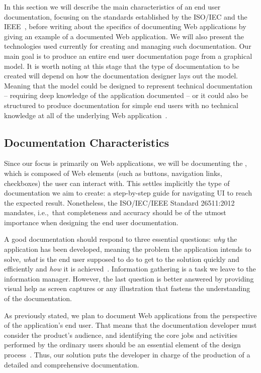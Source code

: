 In this section we will describe the main characteristics of an end user documentation, focusing on the standards established by the ISO/IEC and the IEEE~\cite{ieee5712775, ISO-IEC-IEEE}, before writing about the specifics of documenting Web applications by giving an example of a documented Web application. We will also present the technologies used currently for creating and managing such documentation. Our main goal is to produce an entire end user documentation page from a graphical model. It is worth noting at this stage that the type of documentation to be created will depend on how the documentation designer lays out the model. Meaning that the model could be designed to represent technical documentation -- requiring deep knowledge of the application documented -- or it could also be structured to produce documentation for simple end users with no technical knowledge at all of the underlying Web application~\cite{ieee6081814}.


\subsection{Documentation Characteristics}\label{sec:char}

Since our focus is primarily on Web applications, we will be documenting the , which is composed of Web elements (such as buttons, navigation links, checkboxes) the user can interact with. This settles implicitly the type of documentation we aim to create: a step-by-step guide for navigating UI to reach the expected result. Nonetheless, the ISO/IEC/IEEE Standard 26511:2012~\cite{ieee6170926} mandates, i.e.,~that completeness and accuracy should be of the utmost importance when designing the end user documentation.

A good documentation should respond to three essential questions: \textit{why} the application has been developed, meaning the problem the application intends to solve, \textit{what} is the end user supposed to do to get to the solution quickly and efficiently and \textit{how} it is achieved~\cite{ISO-IEC-IEEE}. Information gathering is a task we leave to the information manager. However, the last question is better answered by providing visual help as screen captures or any illustration that fastens the understanding of the documentation. 

As previously stated, we plan to document Web applications from the perspective of the application's end user. That means that the documentation developer must consider the product's audience, and identifying the core jobs and activities performed by the ordinary users should be an essential element of the design process~\cite{ISO-IEC-IEEE}. Thus, our solution puts the developer in charge of the production of a detailed and comprehensive documentation.

